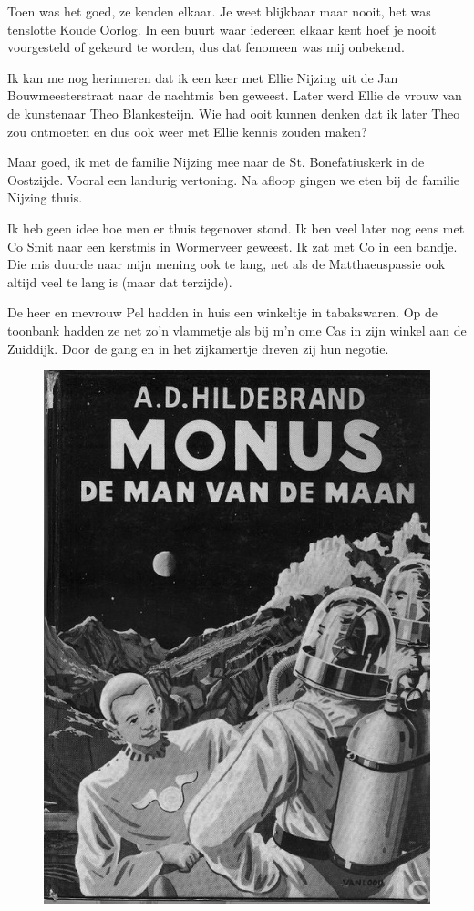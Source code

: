 \documentclass[10pt,twoside, openright]{memoir}
\begin{document}
Toen was het goed, ze kenden elkaar. Je weet blijkbaar maar nooit, het was tenslotte Koude Oorlog. In een buurt waar iedereen elkaar kent hoef je nooit voorgesteld of gekeurd te worden, dus dat fenomeen was mij onbekend.

Ik kan me nog herinneren dat ik een keer met Ellie Nijzing uit de Jan Bouwmeesterstraat naar de nachtmis ben geweest. Later werd Ellie de vrouw van de kunstenaar Theo Blankesteijn. Wie had ooit kunnen denken dat ik later Theo zou ontmoeten en dus ook weer met Ellie kennis zouden maken?

Maar goed, ik met de familie Nijzing mee naar de St. Bonefatiuskerk in de Oostzijde. Vooral een landurig vertoning. Na afloop gingen we eten bij de familie Nijzing thuis. 

Ik heb geen idee hoe men er thuis tegenover stond. Ik ben veel later nog eens met Co Smit naar een kerstmis in Wormerveer geweest. Ik zat met Co in een bandje. Die mis duurde naar mijn mening ook te lang, net als de Matthaeuspassie ook altijd veel te lang is (maar dat terzijde).

De heer en mevrouw Pel hadden in huis een winkeltje in tabakswaren. Op de toonbank hadden ze net zo'n vlammetje als bij m'n ome Cas in zijn winkel aan de Zuiddijk. Door de gang en in het zijkamertje dreven zij hun negotie. 

\begin{figure}
\includegraphics[width=\textwidth]{img/Monus}
\caption*{\footnotesize }
\end{figure} 
\end{document}
